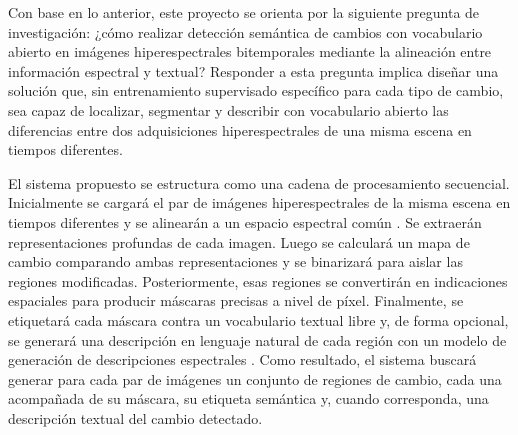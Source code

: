Con base en lo anterior, este proyecto se orienta por la siguiente pregunta de investigación: ¿cómo realizar detección semántica de cambios con vocabulario abierto en imágenes hiperespectrales bitemporales mediante la alineación entre información espectral y textual? Responder a esta pregunta implica diseñar una solución que, sin entrenamiento supervisado específico para cada tipo de cambio, sea capaz de localizar, segmentar y describir con vocabulario abierto las diferencias entre dos adquisiciones hiperespectrales de una misma escena en tiempos diferentes.

El sistema propuesto se estructura como una cadena de procesamiento secuencial. Inicialmente se cargará el par de imágenes hiperespectrales de la misma escena en tiempos diferentes y se alinearán a un espacio espectral común \parencite{wang2024hypersigma}. Se extraerán representaciones profundas de cada imagen. Luego se calculará un mapa de cambio comparando ambas representaciones y se binarizará para aislar las regiones modificadas. Posteriormente, esas regiones se convertirán en indicaciones espaciales para producir máscaras precisas a nivel de píxel. Finalmente, se etiquetará cada máscara contra un vocabulario textual libre y, de forma opcional, se generará una descripción en lenguaje natural de cada región con un modelo de generación de descripciones espectrales \parencite{li2022blip,das2025hypercap}. Como resultado, el sistema buscará generar para cada par de imágenes un conjunto de regiones de cambio, cada una acompañada de su máscara, su etiqueta semántica y, cuando corresponda, una descripción textual del cambio detectado.


